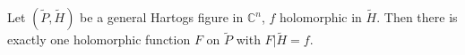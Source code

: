 Let $(\tilde{P}, \tilde{H})$ be a general Hartogs figure in $\mathbb{C}^n$, $f$ holomorphic in $\tilde{H}$. Then there is exactly one holomorphic function $F$ on $\tilde{P}$ with $F|\tilde{H} = f$.
